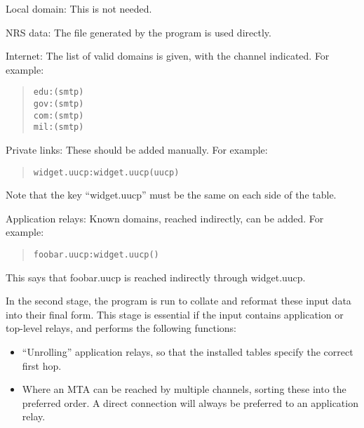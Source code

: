 \begin{describe}
\item [Local domain:]
This is not needed. 

\item[NRS data:]	The file  generated by the 
program is used directly.

\item[Internet:]
The list of valid domains is given, with the channel indicated. 
For example:

\begin{quote}\small\begin{verbatim}
edu:(smtp)
gov:(smtp)
com:(smtp)
mil:(smtp)
\end{verbatim}\end{quote}

\item [Private links:]
These should be added manually. For example:
\begin{quote}\small\begin{verbatim}
widget.uucp:widget.uucp(uucp)
\end{verbatim}\end{quote}
Note that the key ``widget.uucp'' must be the same on each side of the table.

\item [Application relays:]
Known domains, reached indirectly, can be added.
For example:

\begin{quote}\small\begin{verbatim}
foobar.uucp:widget.uucp()
\end{verbatim}\end{quote}

This says that foobar.uucp is reached indirectly through widget.uucp.
\end{describe}


In the second stage, the program  is run to collate and
reformat these input data into their final form.  This stage is
essential if the input contains application or top-level relays, and
performs the following functions:

\begin {itemize}
\item ``Unrolling'' application relays, so that the installed tables specify
the correct first hop.

\item Where an MTA can be reached by multiple channels, sorting these into
the preferred order.  A direct connection will always be preferred to an
application relay.
\end {itemize}

